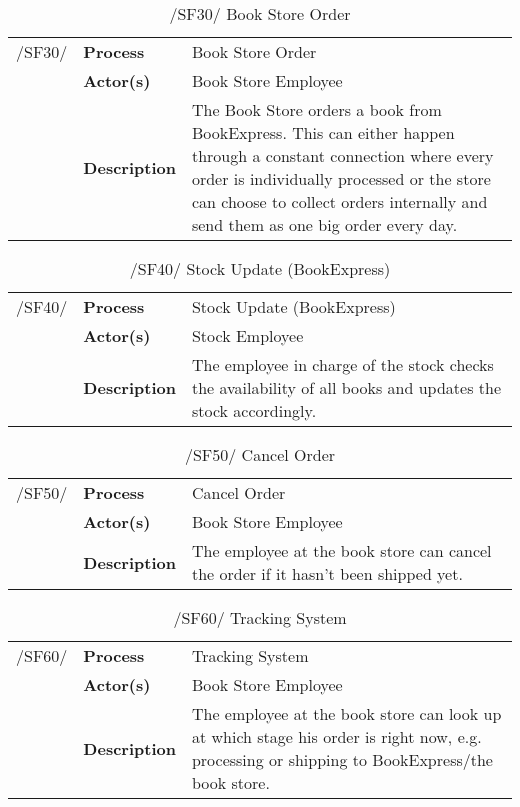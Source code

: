 \documentclass[11pt,a4paper,oneside,svgnames]{report}
\begin{document}
\begin{table}[H]
\centering
\begin{tabular}{p{1.5cm}p{3cm}p{8cm}}
\cellcolor{white}/SF30/	& \textbf{Process}	& Book Store Order \\
\cellcolor{white}		& \textbf{Actor(s)} &  Book Store Employee \\
\cellcolor{white}		& \textbf{Description}	 &  The Book Store orders a book from BookExpress. This can either happen through a constant connection where every order is individually processed or the store can choose to collect orders internally and send them as one big order every day. \\
\end{tabular}
\caption{/SF30/ Book Store Order}
\end{table}

\begin{table}[H]
\centering
\begin{tabular}{p{1.5cm}p{3cm}p{8cm}}
\cellcolor{white}/SF40/	& \textbf{Process}	&  Stock Update (BookExpress)\\
\cellcolor{white}		& \textbf{Actor(s)} &  Stock Employee  \\
\cellcolor{white}		& \textbf{Description}	 & The employee in charge of the stock checks the availability of all books and updates the stock accordingly. \\
\end{tabular}
\caption{/SF40/  Stock Update (BookExpress)}
\end{table}


\begin{table}[H]
\centering
\begin{tabular}{p{1.5cm}p{3cm}p{8cm}}
\cellcolor{white}/SF50/	& \textbf{Process}	& Cancel Order \\
\cellcolor{white}		& \textbf{Actor(s)} &   Book Store Employee\\
\cellcolor{white}		& \textbf{Description}	 &  The employee at the book store can cancel the order if it hasn't been shipped yet. \\
\end{tabular}
\caption{/SF50/ Cancel Order}
\end{table}

\begin{table}[H]
\centering
\begin{tabular}{p{1.5cm}p{3cm}p{8cm}}
\cellcolor{white}/SF60/	& \textbf{Process}	&  Tracking System \\
\cellcolor{white}		& \textbf{Actor(s)} &  Book Store Employee\\
\cellcolor{white}		& \textbf{Description}	 &  The employee at the book store can look up at which stage his order is right now, e.g. processing or shipping to BookExpress/the book store.\\
\end{tabular}
\caption{/SF60/ Tracking System }
\end{table}
\end{document}
